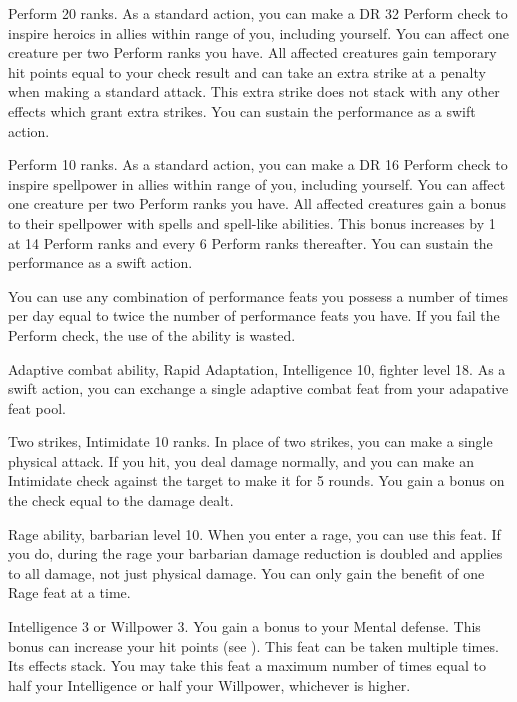 \featpre Perform 20 ranks.
\featben As a standard action, you can make a DR 32 Perform check to inspire heroics in allies within \rngmed range of you, including yourself.
You can affect one creature per two Perform ranks you have.
All affected creatures gain temporary hit points equal to your check result and can take an extra strike at a  penalty when making a standard attack.
This extra strike does not stack with any other effects which grant extra strikes.
You can sustain the performance as a swift action.

\featpre Perform 10 ranks.
\featben As a standard action, you can make a DR 16 Perform check to inspire spellpower in allies within \rngmed range of you, including yourself.
You can affect one creature per two Perform ranks you have.
All affected creatures gain a  bonus to their spellpower with spells and spell-like abilities.
This bonus increases by 1 at 14 Perform ranks and every 6 Perform ranks thereafter.
You can sustain the performance as a swift action.

You can use any combination of performance feats you possess a number of times per day equal to twice the number of performance feats you have.
If you fail the Perform check, the use of the ability is wasted.

\featpre Adaptive combat ability, Rapid Adaptation, Intelligence 10, fighter level 18.
\featben As a swift action, you can exchange a single adaptive combat feat from your adapative feat pool.

\featpres Two strikes, Intimidate 10 ranks.
\featben In place of two strikes, you can make a single physical attack.
If you hit, you deal damage normally, and you can make an Intimidate check against the target to make it \shaken for 5 rounds.
You gain a bonus on the check equal to the damage dealt.

\featpre Rage ability, barbarian level 10.
\featben When you enter a rage, you can use this feat. If you do, during the rage your barbarian damage reduction is doubled and applies to all damage, not just physical damage.
 You can only gain the benefit of one Rage feat at a time.

\featpre Intelligence 3 or Willpower 3.
\featben You gain a  bonus to your Mental defense.
This bonus can increase your hit points (see ).
 This feat can be taken multiple times. Its effects stack.
You may take this feat a maximum number of times equal to half your Intelligence or half your Willpower, whichever is higher.

